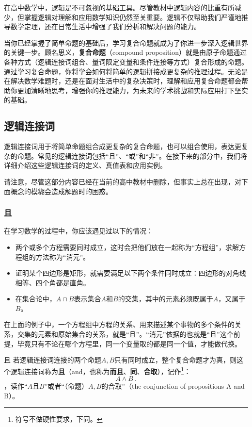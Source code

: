 
\begin{issues}
\issueDraft
\end{issues}


在高中数学中，逻辑是不可忽视的基础工具。尽管教材中逻辑内容的比重有所减少，但掌握逻辑对理解和应用数学知识仍然至关重要。逻辑不仅帮助我们严谨地推导数学定理，还在日常生活中增强了我们分析和解决问题的能力。

当你已经掌握了简单命题的基础后，学习复合命题就成为了你进一步深入逻辑世界的关键一步。顾名思义，\textbf{复合命题}（compound proposition）就是由原子命题通过各种方式（逻辑连接词组合、量词限定变量和条件连接等方式）复合形成的命题。通过学习复合命题，你将学会如何将简单的逻辑拼接成更复杂的推理过程。无论是在解决数学难题时，还是在面对生活中的复杂决策时，理解和应用复合命题都会帮助你更加清晰地思考，增强你的推理能力，为未来的学术挑战和实际应用打下坚实的基础。

\subsection{逻辑连接词}

逻辑连接词用于将简单命题组合成更复杂的复合命题，也可以组合使用，表达更复杂的命题。常见的逻辑连接词包括“且”、“或”和“非”。在接下来的部分中，我们将详细介绍这些逻辑连接词的定义、真值表和应用实例。

请注意，尽管这部分内容已经在当前的高中教材中删除，但事实上总在出现，对下面概念的模糊会造成解题时的困惑。

\subsubsection{且}

在学习数学的过程中，你应该遇见过以下的情况：
\begin{itemize}
\item 两个或多个方程需要同时成立，这时会把他们放在一起称为“方程组”，求解方程组的方法称为“消元”。
\item 证明某个四边形是矩形，就需要满足以下两个条件同时成立：四边形的对角线相等、四个角都是直角。
\item 在集合论中，$A \cap B$表示集合$A$和$B$的交集，其中的元素必须既属于$A$，又属于$B$。
\end{itemize}

在上面的例子中，一个方程组中方程的关系、用来描述某个事物的多个条件的关系，交集的元素和原始集合的关系，就是“且”。“消元”依据的也就是“且”这个前提，毕竟只有不论在哪个方程里，同一个变量取的都是同一个值，才能做代换。
\begin{definition}{且}\label{def_HsCoPr_1}
若逻辑连接词连接的两个命题$A,B$只有同时成立，整个复合命题才为真，则这个逻辑连接词称为\textbf{且}（and，也称为\textbf{而且}、\textbf{同}、\textbf{合取}），记作\footnote{符号不做硬性要求，下同。}：
\begin{equation}
A\land B~.
\end{equation}
，读作“$A$且$B$”或者“（命题）$A,B$的合取”（the conjunction of propositions A and B）。
\end{definition}

